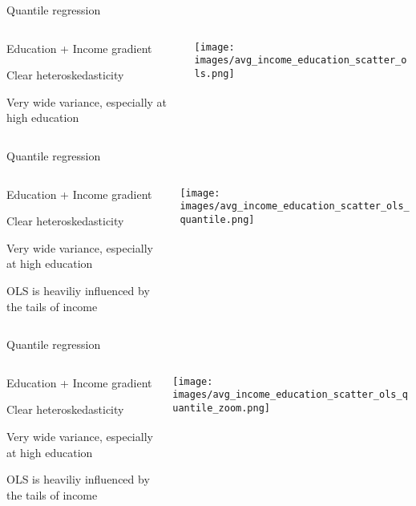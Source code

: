 \documentclass[notes,11pt, aspectratio=169]{beamer}
\newenvironment{wideitemize}{\itemize\addtolength{\itemsep}{10pt}}{\enditemize}
\begin{document}
\begin{frame}{Quantile regression}
  \begin{columns}[T] %
    \begin{column}{.3\textwidth}
  \begin{wideitemize}
    \item Education + Income  gradient
    \item Clear heteroskedasticity
    \item Very wide variance, especially at high education
  \end{wideitemize}
  \end{column}%
  \hfill%
  \begin{column}{.7\textwidth}
    \texttt{[image: images/avg\_income\_education\_scatter\_ols.png]}
  \end{column}
\end{columns}
\end{frame}
\begin{frame}{Quantile regression}
  \begin{columns}[T] %
    \begin{column}{.3\textwidth}
  \begin{wideitemize}
    \item Education + Income  gradient
    \item Clear heteroskedasticity
    \item Very wide variance, especially at high education
    \item OLS is heaviliy influenced by the tails of income
  \end{wideitemize}
  \end{column}%
  \hfill%
  \begin{column}{.7\textwidth}
    \texttt{[image: images/avg\_income\_education\_scatter\_ols\_quantile.png]}
  \end{column}
\end{columns}
\end{frame}

\begin{frame}{Quantile regression}
  \begin{columns}[T] %
    \begin{column}{.3\textwidth}
  \begin{wideitemize}
    \item Education + Income  gradient
    \item Clear heteroskedasticity
    \item Very wide variance, especially at high education
    \item OLS is heaviliy influenced by the tails of income      
  \end{wideitemize}
  \end{column}%
  \hfill%
  \begin{column}{.7\textwidth}
    \texttt{[image: images/avg\_income\_education\_scatter\_ols\_quantile\_zoom.png]}
  \end{column}
\end{columns}
\end{frame}
\end{document}
